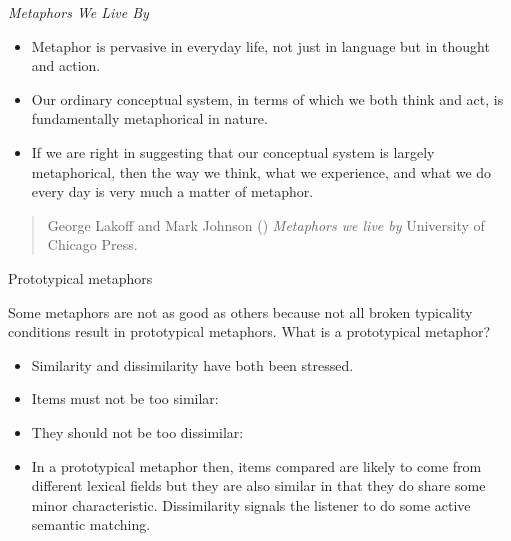 \begin{frame}{\textit{Metaphors We Live By}}

\begin{itemize}
\item Metaphor is pervasive in everyday life, not just in
language but in thought and action.
\item Our ordinary conceptual system, in terms of which we
both think and act, is fundamentally metaphorical in
nature.
\item If we are right in suggesting that our conceptual system
is largely metaphorical, then the way we think, what we
experience, and what we do every day is very much a
matter of metaphor.
\end{itemize}

\begin{quote}
  George Lakoff and Mark Johnson (\citeyear{Lakoff:Johnson:1980}) \textit{Metaphors we live by} 
  University of Chicago Press.
\end{quote}



\end{frame}

\begin{frame}[allowframebreaks]{Prototypical metaphors}

Some metaphors are not as good as others because not all broken typicality
conditions result in prototypical metaphors. What is a prototypical
metaphor?

\begin{itemize}
\item Similarity and dissimilarity have both been stressed.
\item Items must not be too similar:
  \begin{exe}
    \ex {}
    \ex {}
    \ex {}
  \end{exe}
\framebreak
\item They should not be too dissimilar:
  \begin{exe}
    \ex {}
    \ex {}
    \ex {}
  \end{exe}
\item In a prototypical metaphor then, items compared are
likely to come from different lexical fields but they are
also similar in that they do share some minor
characteristic. Dissimilarity signals the listener to do
some active semantic matching.
\begin{exe}
  \ex {}
  \ex {}
  \ex {}
\end{exe}
\end{itemize}

\end{frame}

